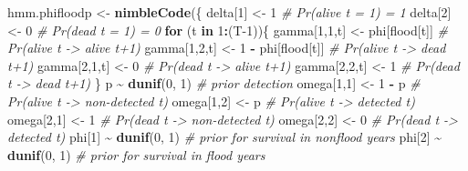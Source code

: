 \documentclass[
  12pt,
]{krantz}
\newenvironment{Shaded}{\begin{snugshade}}{\end{snugshade}}
\newcommand{\CommentTok}[1]{\textcolor[rgb]{0.56,0.35,0.01}{\textit{#1}}}
\newcommand{\ControlFlowTok}[1]{\textcolor[rgb]{0.13,0.29,0.53}{\textbf{#1}}}
\newcommand{\DecValTok}[1]{\textcolor[rgb]{0.00,0.00,0.81}{#1}}
\newcommand{\FunctionTok}[1]{\textcolor[rgb]{0.13,0.29,0.53}{\textbf{#1}}}
\newcommand{\NormalTok}[1]{#1}
\newcommand{\OtherTok}[1]{\textcolor[rgb]{0.56,0.35,0.01}{#1}}
\newcommand{\SpecialCharTok}[1]{\textcolor[rgb]{0.81,0.36,0.00}{\textbf{#1}}}
\begin{document}
\begin{Shaded}
\begin{Highlighting}[]
\NormalTok{hmm.phifloodp }\OtherTok{\textless{}{-}} \FunctionTok{nimbleCode}\NormalTok{(\{}
\NormalTok{  delta[}\DecValTok{1}\NormalTok{] }\OtherTok{\textless{}{-}} \DecValTok{1}          \CommentTok{\# Pr(alive t = 1) = 1}
\NormalTok{  delta[}\DecValTok{2}\NormalTok{] }\OtherTok{\textless{}{-}} \DecValTok{0}          \CommentTok{\# Pr(dead t = 1) = 0}
  \ControlFlowTok{for}\NormalTok{ (t }\ControlFlowTok{in} \DecValTok{1}\SpecialCharTok{:}\NormalTok{(T}\DecValTok{{-}1}\NormalTok{))\{}
\NormalTok{    gamma[}\DecValTok{1}\NormalTok{,}\DecValTok{1}\NormalTok{,t] }\OtherTok{\textless{}{-}}\NormalTok{ phi[flood[t]]      }\CommentTok{\# Pr(alive t {-}\textgreater{} alive t+1)}
\NormalTok{    gamma[}\DecValTok{1}\NormalTok{,}\DecValTok{2}\NormalTok{,t] }\OtherTok{\textless{}{-}} \DecValTok{1} \SpecialCharTok{{-}}\NormalTok{ phi[flood[t]]  }\CommentTok{\# Pr(alive t {-}\textgreater{} dead t+1)}
\NormalTok{    gamma[}\DecValTok{2}\NormalTok{,}\DecValTok{1}\NormalTok{,t] }\OtherTok{\textless{}{-}} \DecValTok{0}        \CommentTok{\# Pr(dead t {-}\textgreater{} alive t+1)}
\NormalTok{    gamma[}\DecValTok{2}\NormalTok{,}\DecValTok{2}\NormalTok{,t] }\OtherTok{\textless{}{-}} \DecValTok{1}        \CommentTok{\# Pr(dead t {-}\textgreater{} dead t+1)}
\NormalTok{  \}}
\NormalTok{  p }\SpecialCharTok{\textasciitilde{}} \FunctionTok{dunif}\NormalTok{(}\DecValTok{0}\NormalTok{, }\DecValTok{1}\NormalTok{) }\CommentTok{\# prior detection}
\NormalTok{  omega[}\DecValTok{1}\NormalTok{,}\DecValTok{1}\NormalTok{] }\OtherTok{\textless{}{-}} \DecValTok{1} \SpecialCharTok{{-}}\NormalTok{ p    }\CommentTok{\# Pr(alive t {-}\textgreater{} non{-}detected t)}
\NormalTok{  omega[}\DecValTok{1}\NormalTok{,}\DecValTok{2}\NormalTok{] }\OtherTok{\textless{}{-}}\NormalTok{ p        }\CommentTok{\# Pr(alive t {-}\textgreater{} detected t)}
\NormalTok{  omega[}\DecValTok{2}\NormalTok{,}\DecValTok{1}\NormalTok{] }\OtherTok{\textless{}{-}} \DecValTok{1}        \CommentTok{\# Pr(dead t {-}\textgreater{} non{-}detected t)}
\NormalTok{  omega[}\DecValTok{2}\NormalTok{,}\DecValTok{2}\NormalTok{] }\OtherTok{\textless{}{-}} \DecValTok{0}        \CommentTok{\# Pr(dead t {-}\textgreater{} detected t)}
\NormalTok{  phi[}\DecValTok{1}\NormalTok{] }\SpecialCharTok{\textasciitilde{}} \FunctionTok{dunif}\NormalTok{(}\DecValTok{0}\NormalTok{, }\DecValTok{1}\NormalTok{) }\CommentTok{\# prior for survival in nonflood years}
\NormalTok{  phi[}\DecValTok{2}\NormalTok{] }\SpecialCharTok{\textasciitilde{}} \FunctionTok{dunif}\NormalTok{(}\DecValTok{0}\NormalTok{, }\DecValTok{1}\NormalTok{) }\CommentTok{\# prior for survival in flood years}

\end{Highlighting}
\end{Shaded}
\end{document}
